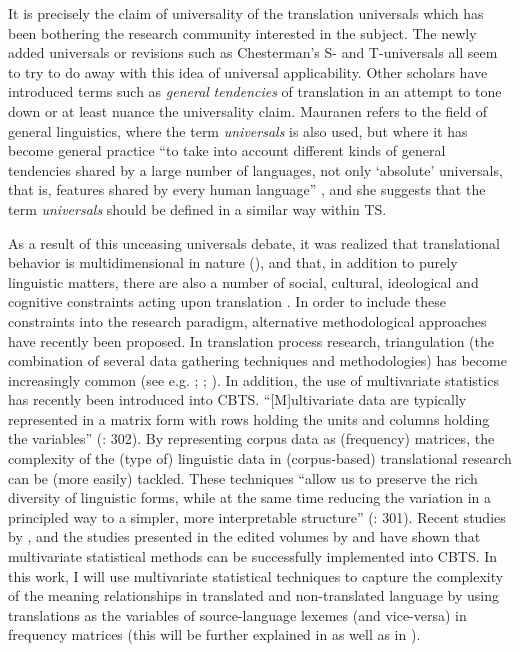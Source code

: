 It is precisely the claim of universality of the translation universals which has been bothering the research community interested in the subject. The newly added universals or revisions such as Chesterman’s S- and T-universals all seem to try to do away with this idea of universal applicability. Other scholars have introduced terms such as \textit{general} \textit{tendencies} of translation in an attempt to tone down or at least nuance the universality claim. Mauranen refers to the field of general linguistics, where the term \textit{universals} is also used, but where it has become general practice “to take into account different kinds of general tendencies shared by a large number of languages, not only ‘absolute’ universals, that is, features shared by every human language” \citep[35]{anderman_universal_2008}, and she suggests that the term \textit{universals} should be defined in a similar way within TS.




As a result of this unceasing universals debate, it was realized that translational behavior is multidimensional in nature (\citealt{de_sutter_inevitability_2013}), and that, in addition to purely linguistic matters, there are also a number of social, cultural, ideological and cognitive constraints acting upon translation \citep{baker_role_1999}. In order to include these constraints into the research paradigm, alternative methodological approaches have recently been proposed. In translation process research, triangulation (the combination of several data gathering techniques and methodologies) has become increasingly common (see e.g. \citealt{alves_foreword._2003}; \citealt{carl_triangulating_2010}; \citealt{shreve_integrative_2010}). In addition, the use of multivariate statistics has recently been introduced into CBTS. “[M]ultivariate data are typically represented in a matrix form with rows holding the units and columns holding the variables” (\citealt{meng_multivariate_2012}: 302). By representing corpus data as (frequency) matrices, the complexity of the (type of) linguistic data in (corpus-based) translational research can be (more easily) tackled. These techniques “allow us to preserve the rich diversity of linguistic forms, while at the same time reducing the variation in a principled way to a simpler, more interpretable structure” (\citealt{meng_multivariate_2012}: 301). Recent studies by  \citet{DelaereEtAl2012}, \citet{szmrecsanyi_weakly_2014} and the studies presented in the edited volumes by \citet{oakes_quantitative_2012} and  \citet{DeSutterEtAl2017} have shown that multivariate statistical methods can be successfully implemented into CBTS. In this work, I will use multivariate statistical techniques to capture the complexity of the meaning relationships in translated and non-translated language by using translations as the variables of source-language lexemes (and vice-versa) in frequency matrices (this will be further explained in  as well as in ).


